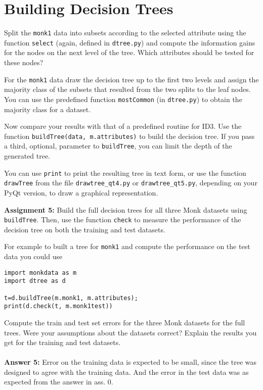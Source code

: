 \documentclass[11pt]{article}
\begin{document}
\section{Building Decision Trees}

Split the \texttt{monk1} data into subsets according to the selected
attribute using the function \texttt{select} (again, defined in
\verb!dtree.py!)  and compute the information gains for the nodes on
the next level of the tree.  Which attributes should be tested for
these nodes?

For the \texttt{monk1} data draw the decision tree up to the first two
levels and assign the majority class of the subsets that resulted from
the two splits to the leaf nodes.  You can use the predefined function
\texttt{mostCommon} (in \verb!dtree.py!) to obtain the majority class
for a dataset.

Now compare your results with that of a predefined routine for ID3.
Use the function \verb!buildTree(data, m.attributes)! to build the
decision tree.  If you pass a third, optional, parameter to
\texttt{buildTree}, you can limit the depth of the generated tree.

You can use \texttt{print} to print the resulting tree in text form,
or use the function \texttt{drawTree} from the file \verb!drawtree_qt4.py! 
or \verb!drawtree_qt5.py!, depending on your PyQt version, to draw a graphical 
representation.

\begin{tcolorbox}
\textbf{Assignment 5:} 
Build the full decision trees for all three Monk datasets using
\texttt{buildTree}.  Then, use the function \texttt{check} to measure the performance
of the decision tree on both the training and test datasets.

For example to built a tree for \texttt{monk1} and compute the performance on the test data
you could use
\begin{verbatim}
import monkdata as m
import dtree as d

t=d.buildTree(m.monk1, m.attributes);
print(d.check(t, m.monk1test))
\end{verbatim}

Compute the train and test set errors for the three Monk datasets for
the full trees. Were your assumptions about the datasets correct? Explain the 
results you get for the training and test datasets.\\\\

\textbf{Answer 5:}
Error on the training data is expected to be small, since the tree was designed to agree with the training data. And the error in the test data was as expected from the answer in ass. 0.
\end{tcolorbox}
\end{document}
